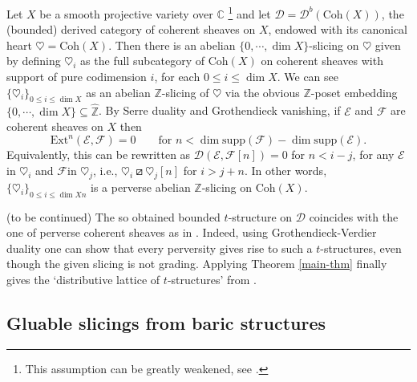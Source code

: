 \documentclass{article}
\theoremstyle{definition}
\newcommand{\Z}{\mathbb{Z}}
\newcommand{\orth}{\boxslash}
\begin{document}
 Let $X$ be a smooth projective variety over $\mathbb{C}$ \footnote{This assumption can be greatly weakened, see \cite{bezr}.} and let $\mathscr{D} = \mathscr{D}^b(\textrm{Coh}(X))$, the (bounded) derived category of coherent sheaves on $X$, endowed with its canonical heart $\heartsuit = \textrm{Coh}(X)$. Then there is an abelian $\{0, \cdots , \dim X \}$-slicing on $\heartsuit$ given by defining $\heartsuit_i$ as the full subcategory of $\textrm{Coh}(X)$ on coherent sheaves with support of pure codimension $i$, for each $0 \leq i \leq \dim X$. 
 We can see $\{\heartsuit_i\}_{0\leq i\leq \dim X}$ as an abelian $\Z$-slicing of $\heartsuit$ via the obvious $\Z$-poset embedding $\{0, \cdots , \dim X \} \subseteq \hat{\Z}$. By Serre duality and Grothendieck vanishing, if $\mathscr{E}$ and $\mathscr{F}$ are coherent sheaves on $X$ then
 \[
 \mathrm{Ext}^n(\mathscr{E},\mathscr{F})=0\qquad \text{for } n<\dim \mathrm{supp}(\mathscr{F})-\dim\mathrm{supp}(\mathscr{E}).
 \]
  Equivalently, this can be rewritten as $\mathscr{D}(\mathscr{E},\mathscr{F}[n])=0$ for $n<i-j$, for any $\mathscr{E}$ in $\heartsuit_i$ and $\mathscr{F}$in $\heartsuit_j$, i.e., 
 $\heartsuit_{i}\orth\heartsuit_{j}[n]$ for $i>j+n$. In other words, $\{\heartsuit_i\}_{0\leq i\leq \dim Xn}$ is a perverse abelian $\Z$-slicing on $\textrm{Coh}(X)$.
 
 {\color{red}(to be continued)}
  The so obtained bounded $t$-structure on $\mathscr{D}$ coincides with the one of perverse coherent sheaves as in \cite{bezr}. Indeed, using Grothendieck-Verdier duality one can show that every perversity gives rise to such a $t$-structures, even though the given slicing is not grading. Applying  Theorem \ref{main-thm} finally gives the `distributive lattice of $t$-structures' from \cite{bondper}. 


\subsection{Gluable slicings from baric structures}\label{baric}
\end{document}
